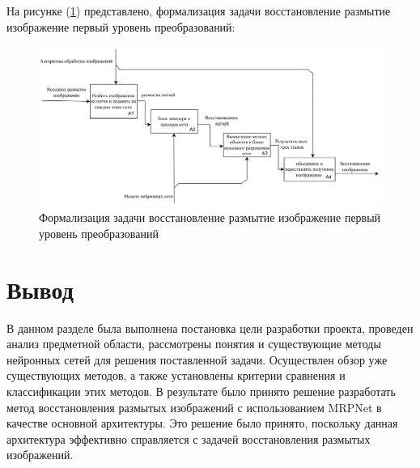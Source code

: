 На рисунке (\ref{fig:method-desc-a1}) представлено, формализация задачи восстановление размытие изображение первый уровень преобразований: 
\begin{figure}[H]
	\centering
	\includegraphics[width=1\linewidth]{assets/idef0-A1.png}
	\caption{Формализация задачи восстановление размытие изображение первый уровень преобразований}
	\label{fig:method-desc-a1}
\end{figure}

\section*{Вывод}

В данном разделе была выполнена постановка цели разработки проекта, проведен анализ предметной области, рассмотрены понятия и существующие методы нейронных сетей для решения поставленной задачи. Осуществлен обзор уже существующих методов, а также установлены критерии сравнения и классификации этих методов. В результате было принято решение разработать метод восстановления размытых изображений с использованием MRPNet в качестве основной архитектуры. Это решение было принято, поскольку данная архитектура эффективно справляется с задачей восстановления размытых изображений.
